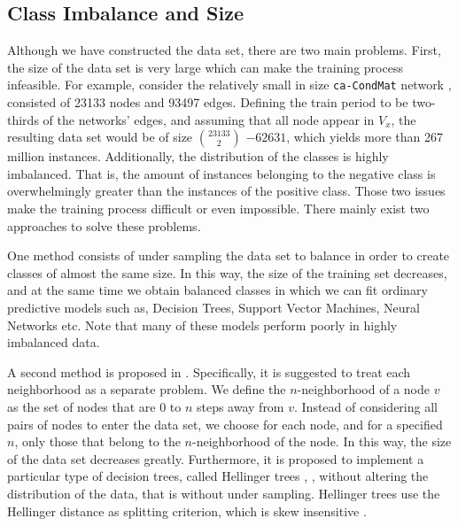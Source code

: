 \documentclass{acm_proc_article-sp}
\begin{document}
\subsection{Class Imbalance and Size}
Although we have constructed the data set, there are two main problems. First, the size of the data set is very large which can make the training process infeasible. For example, consider the relatively small in size \texttt{ca-CondMat} network \cite{Leskovec:2007:GED:1217299.1217301}, consisted of 23133 nodes and 93497 edges. Defining the train period to be two-thirds of the networks' edges, and assuming that all node appear in $V_x$, the resulting data set would be of size $23133 \choose 2$ $ - 62631$, which yields more than 267 million instances. Additionally, the distribution of the classes is highly imbalanced. That is, the amount of instances belonging to the negative class is overwhelmingly greater than the instances of  the positive class. Those two issues make the training process difficult or even impossible. There mainly exist two approaches to solve these problems.

One method consists of under sampling the data set to balance in order to create classes of almost the same size. In this way, the size of the training set decreases, and at the same time we obtain balanced classes in which we can fit ordinary predictive models such as, Decision Trees, Support Vector Machines, Neural Networks etc. Note that many of these models perform poorly in highly imbalanced data. 	 

A second method is proposed in \cite{Lichtenwalter:2010:NPM:1835804.1835837}. Specifically, it is suggested to treat each neighborhood as a separate problem. We define the $n$-neighborhood of a node $v$ as the set of nodes that are 0 to $n$ steps away from $v$. Instead of considering all pairs of nodes to enter the data set, we choose for each node, and for a specified $n$, only those that belong to the $n$-neighborhood of the node. In this way, the size of the data set decreases greatly. Furthermore, it is proposed to implement a particular type of decision trees, called Hellinger trees  \cite{Cieslak2008}, \cite{Cieslak2012}, without altering the distribution of the data, that is without under sampling. Hellinger trees use the Hellinger distance as splitting criterion, which is skew insensitive \cite{Cieslak2012}.



\end{document}
